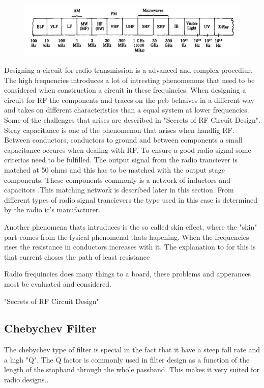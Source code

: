\begin{figure}[H] 
	\centering 
	\includegraphics[width=.8\linewidth]{Figures/Full_frequency_band} 
	\label{fig:full_freq_band} 
\end{figure} 

Designing a circuit for radio transmission is a advanced and complex procediur. The high frequencies introduces a lot of intresting phenomenons that need to be considered when construction a circuit in these frequincies. When designing a circuit for RF the components and traces on the \gls{pcb} behaives in a different way and takes on different characteristics than a equal system at lower frequencies. Some of the challenges that arises are described in "Secrets of RF Circuit Design". Stray capacitance is one of the phenomenon that arises when handlig RF. Between conductors, conductors to ground and between components a small capacitance occures when dealing with RF. To ensure a good radio signal  some criterias need to be fulfilled. 
The output signal from the radio tranciever is matched at 50 ohms and this has to be matched with the output stage components. These components commonly is a network of inductors and capacitors .This matching network is described later in this section. 
From different types of radio signal trancievers the type used in this case is determined by the radio \gls{ic}'s manufacturer. %


Another phenomena thats intruduces is the so called skin effect, where the "skin" part comes from the fysical phenomenal thats hapening. When the frequencies rises the resistance in conductors increases with it. The explanation to for this is that current choses the path of least resistance


Radio frequincies does many things to a board, these problems and apperances most be evaluated and considered.  



"Secrets of RF Circuit Design"
 
\subsection{Chebychev Filter}
The chebychev type of filter is special in the fact that it have a steep fall rate and a high "Q". The Q factor is commonly used in filter design as a function of the length of the stopband through the whole passband.
This makes it very suited for radio designs.. 


